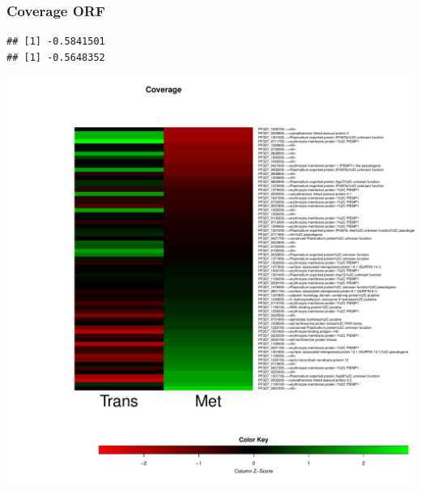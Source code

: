 \documentclass{article}\usepackage[]{graphicx}\usepackage[]{color}
\makeatletter
\newenvironment{kframe}{%
 \def\at@end@of@kframe{}%
 \ifinner\ifhmode%
  \def\at@end@of@kframe{\end{minipage}}%
  \begin{minipage}{\columnwidth}%
 \fi\fi%
 \def\FrameCommand##1{\hskip\@totalleftmargin \hskip-\fboxsep
 \colorbox{shadecolor}{##1}\hskip-\fboxsep
     \hskip-\linewidth \hskip-\@totalleftmargin \hskip\columnwidth}%
 \MakeFramed {\advance\hsize-\width
   \@totalleftmargin\z@ \linewidth\hsize
   \@setminipage}}%
 {\par\unskip\endMakeFramed%
 \at@end@of@kframe}
\newenvironment{knitrout}{}{} %
\makeatother
\begin{document}
\subsubsection{Coverage ORF}
\begin{knitrout}
\color{fgcolor}\begin{kframe}
\begin{verbatim}
## [1] -0.5841501
## [1] -0.5648352
\end{verbatim}
\end{kframe}

{\centering \includegraphics[width=.9\linewidth]{figure/minimal-met_cov_ORF-1} 

}



\end{knitrout}
\clearpage
\end{document}
